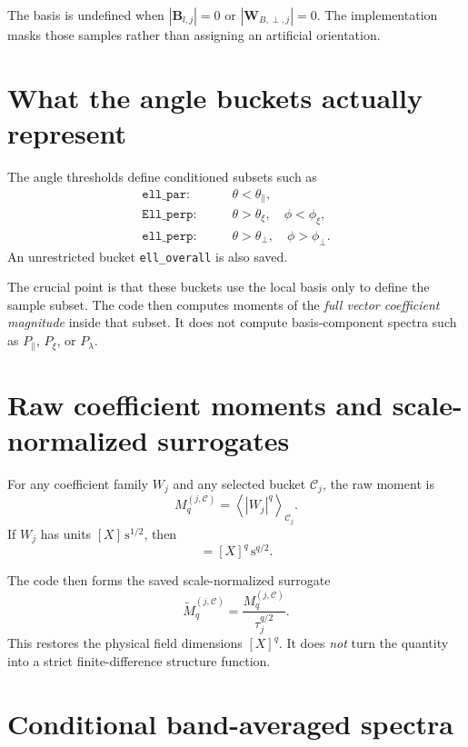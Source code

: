 \documentclass[11pt]{article}
\begin{document}
The basis is undefined when $|\mathbf{B}_{l,j}|=0$ or $|\mathbf{W}_{B,\perp,j}|=0$.
The implementation masks those samples rather than assigning an artificial
orientation.

\section{What the angle buckets actually represent}

The angle thresholds define conditioned subsets such as
\begin{align}
 \texttt{ell\_par}:& \qquad \theta < \theta_{\parallel}, \\
 \texttt{Ell\_perp}:& \qquad \theta > \theta_{\xi}, \quad \phi < \phi_{\xi}, \\
 \texttt{ell\_perp}:& \qquad \theta > \theta_{\perp}, \quad \phi > \phi_{\perp}.
\end{align}
An unrestricted bucket \texttt{ell\_overall} is also saved.

The crucial point is that these buckets use the local basis only to define the
sample subset. The code then computes moments of the \emph{full vector coefficient
magnitude} inside that subset. It does not compute basis-component spectra such as
$P_{\parallel}$, $P_{\xi}$, or $P_{\lambda}$.

\section{Raw coefficient moments and scale-normalized surrogates}

For any coefficient family $W_j$ and any selected bucket $\mathcal{C}_j$, the raw
moment is
\begin{equation}
 M_q^{(j,\mathcal{C})} = \left\langle |W_j|^q \right\rangle_{\mathcal{C}_j}.
\end{equation}
If $W_j$ has units $[X]\,\mathrm{s}^{1/2}$, then
\begin{equation}
 [M_q^{(j,\mathcal{C})}] = [X]^q\,\mathrm{s}^{q/2}.
\end{equation}

The code then forms the saved scale-normalized surrogate
\begin{equation}
 \widetilde{M}_q^{(j,\mathcal{C})} = \frac{M_q^{(j,\mathcal{C})}}{\tau_j^{q/2}}.
\end{equation}
This restores the physical field dimensions $[X]^q$. It does \emph{not} turn the
quantity into a strict finite-difference structure function.

\section{Conditional band-averaged spectra}
\end{document}

